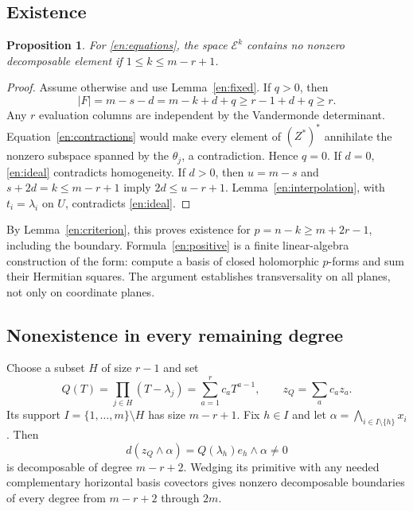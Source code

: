 \documentclass[12pt]{amsart}
\newtheorem{prop}[thm]{Proposition}
\theoremstyle{definition}
\theoremstyle{remark}
\numberwithin{equation}{section}
\newcommand{\Eex}{\mathcal E}
\begin{document}
\subsection{Existence}
\begin{prop}\label{en:noexact}
For \eqref{en:equations}, the space $\Eex^k$ contains no nonzero
decomposable element if $1\leq k\leq m-r+1$.
\end{prop}
\begin{proof}
Assume otherwise and use Lemma~\ref{en:fixed}. If $q>0$, then
\[
 |F|=m-s-d=m-k+d+q\geq r-1+d+q\geq r.
\]
Any $r$ evaluation columns are independent by the Vandermonde determinant.
Equation~\eqref{en:contractions} would make every element of $(Z^*)^*$
annihilate the nonzero subspace spanned by the $\theta_j$, a contradiction.
Hence $q=0$. If $d=0$, \eqref{en:ideal} contradicts homogeneity.
If $d>0$, then $u=m-s$ and
$s+2d=k\leq m-r+1$ imply $2d\leq u-r+1$.
Lemma~\ref{en:interpolation}, with $t_i=\lambda_i$ on $U$, contradicts
\eqref{en:ideal}.
\end{proof}

By Lemma~\ref{en:criterion}, this proves existence for
$p=n-k\geq m+2r-1$, including the boundary. Formula~\eqref{en:positive}
is a finite linear-algebra construction of the form: compute a basis of
closed holomorphic $p$-forms and sum their Hermitian squares. The argument
establishes transversality on all planes, not only on coordinate planes.

\subsection{Nonexistence in every remaining degree}
Choose a subset $H$ of size $r-1$ and set
\[
 Q(T)=\prod_{j\in H}(T-\lambda_j)
     =\sum_{a=1}^r c_a T^{a-1},\qquad z_Q=\sum_a c_a z_a.
\]
Its support $I=\{1,\ldots,m\}\setminus H$ has size $m-r+1$.
Fix $h\in I$ and let $\alpha=\bigwedge_{i\in I\setminus\{h\}}x_i$.
Then
\begin{equation}\label{en:firstboundary}
 d(z_Q\wedge\alpha)=Q(\lambda_h)e_h\wedge\alpha\ne0
\end{equation}
is decomposable of degree $m-r+2$. Wedging its primitive with any needed
complementary horizontal basis covectors gives nonzero decomposable
boundaries of every degree from $m-r+2$ through $2m$.
\end{document}
